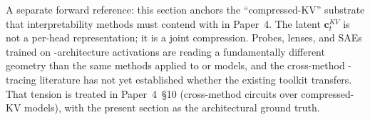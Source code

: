 A separate forward reference: this section anchors the
``compressed-KV'' substrate that interpretability methods must
contend with in Paper~4. The  latent $\mathbf{c}_t^{KV}$ is not
a per-head representation; it is a joint compression. Probes,
lenses, and SAEs trained on -architecture activations are reading
a fundamentally different geometry than the same methods applied to
 or  models, and the cross-method -tracing literature
has not yet established whether the existing toolkit transfers.
That tension is treated in Paper~4~\S 10 (cross-method circuits
over compressed-KV models), with the present section as the
architectural ground truth.
